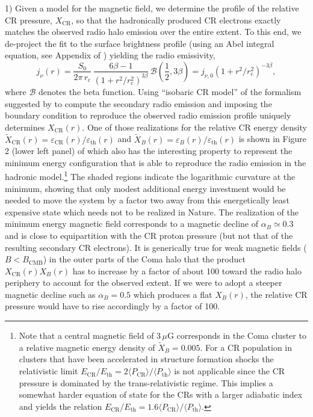\documentclass[12pt,manuscript]{aastex}
\newcommand{\rmn}{\mathrm}
\newcommand{\CR}{\mathrm{CR}}
\newcommand{\eps}{\varepsilon}
\newcommand{\bra}{\langle}
\newcommand{\ket}{\rangle}
\begin{document}
1) Given a model for the magnetic field, we determine the profile of the
relative CR pressure, $X_\CR$, so that the hadronically produced CR electrons
exactly matches the observed radio halo emission over the entire extent. To this
end, we de-project the fit to the surface brightness profile (using an Abel
integral equation, see Appendix of \citealt{2004A&A...413...17P}) yielding the
radio emissivity,
\begin{equation}
  \label{eq:Coma:radio}
  j_\nu (r) = \frac{S_0}{2\pi\, r_\rmn{c}}\, 
  \frac{6\beta - 1}{\left(1 + r^2/r_\rmn{c}^2\right)^{3 \beta}}\,
  \mathcal{B}\left(\frac{1}{2}, 3\beta\right)
  = j_{\nu,0} \left(1 + r^2/r_\rmn{c}^2\right)^{-3 \beta},
\end{equation}
where $\mathcal{B}$ denotes the beta function. Using ``isobaric CR model'' of
the formalism suggested by \citet{2004A&A...413...17P} to compute the secondary
radio emission and imposing the boundary condition to reproduce the observed
radio emission profile uniquely determines $X_\CR(r)$. One of those realizations
for the relative CR energy density $\tilde{X}_\CR(r) = \eps_\CR (r) /
\eps_\rmn{th} (r)$ and $\tilde{X}_B(r) = \eps_B (r) / \eps_\rmn{th} (r)$ is
shown in Figure 2 (lower left panel) of \citet{2004MNRAS.352...76P} which also
has the interesting property to represent the minimum energy configuration that
is able to reproduce the radio emission in the hadronic model.\footnote{Note
  that a central magnetic field of $3\,\mu$G corresponds in the Coma cluster to
  a relative magnetic energy density of $\tilde{X}_B=0.005$. For a CR population
  in clusters that have been accelerated in structure formation shocks the
  relativistic limit $E_\CR/E_\rmn{th} = 2 \bra P_\CR \ket / \bra P_\rmn{th}
  \ket$ is not applicable since the CR pressure is dominated by the
  trans-relativistic regime. This implies a somewhat harder equation of state
  for the CRs with a larger adiabatic index and yields the relation
  $E_\CR/E_\rmn{th} = 1.6 \bra P_\CR \ket / \bra P_\rmn{th} \ket$.}  The shaded
regions indicate the logarithmic curvature at the minimum, showing that only
modest additional energy investment would be needed to move the system by a
factor two away from this energetically least expensive state which needs not to
be realized in Nature.  The realization of the minimum energy magnetic field
corresponds to a magnetic decline of $\alpha_B\simeq0.3$ and is close to
equipartition with the CR proton pressure (but not that of the resulting
secondary CR electrons).  It is generically true for weak magnetic fields
($B<B_\rmn{CMB}$) in the outer parts of the Coma halo that the product
$X_\CR(r)X_B(r)$ has to increase by a factor of about 100 toward the radio halo
periphery to account for the observed extent.  If we were to adopt a steeper
magnetic decline such as $\alpha_B=0.5$ which produces a flat $X_B(r)$, the
relative CR pressure would have to rise accordingly by a factor of 100.
\end{document}
